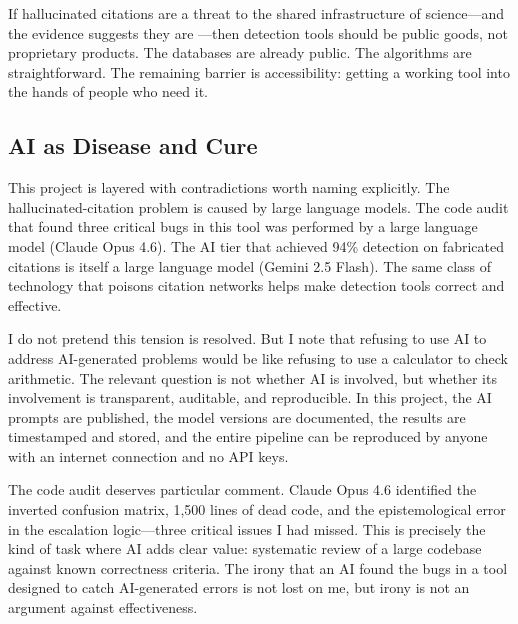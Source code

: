 If hallucinated citations are a threat to the shared infrastructure of science---and the evidence suggests they are \citep{bienz2026, sakai2026, ansari2025}---then detection tools should be public goods, not proprietary products. The databases are already public. The algorithms are straightforward. The remaining barrier is accessibility: getting a working tool into the hands of people who need it.

\subsection{AI as Disease and Cure}

This project is layered with contradictions worth naming explicitly. The hallucinated-citation problem is caused by large language models. The code audit that found three critical bugs in this tool was performed by a large language model (Claude Opus 4.6). The AI tier that achieved 94\% detection on fabricated citations is itself a large language model (Gemini 2.5 Flash). The same class of technology that poisons citation networks helps make detection tools correct and effective.

I do not pretend this tension is resolved. But I note that refusing to use AI to address AI-generated problems would be like refusing to use a calculator to check arithmetic. The relevant question is not whether AI is involved, but whether its involvement is transparent, auditable, and reproducible. In this project, the AI prompts are published, the model versions are documented, the results are timestamped and stored, and the entire pipeline can be reproduced by anyone with an internet connection and no API keys.

The code audit deserves particular comment. Claude Opus 4.6 identified the inverted confusion matrix, 1{,}500 lines of dead code, and the epistemological error in the escalation logic---three critical issues I had missed. This is precisely the kind of task where AI adds clear value: systematic review of a large codebase against known correctness criteria. The irony that an AI found the bugs in a tool designed to catch AI-generated errors is not lost on me, but irony is not an argument against effectiveness.

